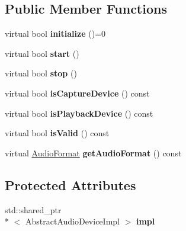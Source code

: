 \subsection*{Public Member Functions}
\begin{DoxyCompactItemize}
\item 
\hypertarget{class_audio_d_x_1_1_abstract_audio_device_a8bc151d485fbbea83d16e15abcc10df2}{virtual bool {\bfseries initialize} ()=0}\label{class_audio_d_x_1_1_abstract_audio_device_a8bc151d485fbbea83d16e15abcc10df2}

\item 
\hypertarget{class_audio_d_x_1_1_abstract_audio_device_a165b72ae32ab24d88018a2c4c7acd188}{virtual bool {\bfseries start} ()}\label{class_audio_d_x_1_1_abstract_audio_device_a165b72ae32ab24d88018a2c4c7acd188}

\item 
\hypertarget{class_audio_d_x_1_1_abstract_audio_device_aed3aa99e6eddb1ccb31e9c467afacc8e}{virtual bool {\bfseries stop} ()}\label{class_audio_d_x_1_1_abstract_audio_device_aed3aa99e6eddb1ccb31e9c467afacc8e}

\item 
\hypertarget{class_audio_d_x_1_1_abstract_audio_device_a5aa3d081130b952871e704d7ff005ec0}{virtual bool {\bfseries is\-Capture\-Device} () const }\label{class_audio_d_x_1_1_abstract_audio_device_a5aa3d081130b952871e704d7ff005ec0}

\item 
\hypertarget{class_audio_d_x_1_1_abstract_audio_device_a503b2a592b55b25903cc3f3e5389bd35}{virtual bool {\bfseries is\-Playback\-Device} () const }\label{class_audio_d_x_1_1_abstract_audio_device_a503b2a592b55b25903cc3f3e5389bd35}

\item 
\hypertarget{class_audio_d_x_1_1_abstract_audio_device_a35eddb40741fef8b011058cdef1c9daa}{virtual bool {\bfseries is\-Valid} () const }\label{class_audio_d_x_1_1_abstract_audio_device_a35eddb40741fef8b011058cdef1c9daa}

\item 
\hypertarget{class_audio_d_x_1_1_abstract_audio_device_a3910313a0578fa3c2b06501cc179af28}{virtual \hyperlink{struct_audio_d_x_1_1_audio_format}{Audio\-Format} {\bfseries get\-Audio\-Format} () const }\label{class_audio_d_x_1_1_abstract_audio_device_a3910313a0578fa3c2b06501cc179af28}

\end{DoxyCompactItemize}
\subsection*{Protected Attributes}
\begin{DoxyCompactItemize}
\item 
\hypertarget{class_audio_d_x_1_1_abstract_audio_device_ae221dbe42940057a92ae0854f97d58d4}{std\-::shared\-\_\-ptr\\*
$<$ Abstract\-Audio\-Device\-Impl $>$ {\bfseries impl}}\label{class_audio_d_x_1_1_abstract_audio_device_ae221dbe42940057a92ae0854f97d58d4}

\end{DoxyCompactItemize}
